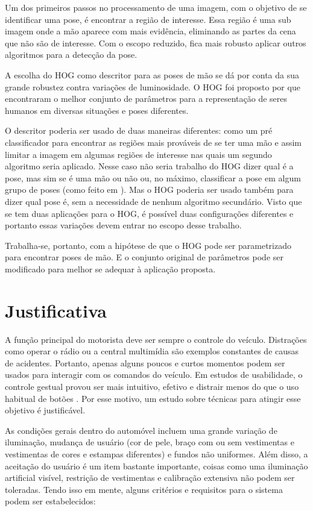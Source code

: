 Um dos primeiros passos no processamento de uma imagem, com o objetivo de se identificar uma pose, é encontrar a região de interesse. Essa região é uma sub imagem onde a mão aparece com mais evidência, eliminando as partes da cena que não são de interesse. Com o escopo reduzido, fica mais robusto aplicar outros algoritmos para a detecção da pose.

A escolha do HOG como descritor para as poses de mão se dá por conta da sua grande robustez contra variações de luminosidade. O HOG foi proposto por  que encontraram o melhor conjunto de parâmetros para a representação de seres humanos em diversas situações e poses diferentes. 

O descritor poderia ser usado de duas maneiras diferentes: como um pré classificador para encontrar as regiões mais prováveis de se ter uma mão e assim limitar a imagem em algumas regiões de interesse nas quais um segundo algoritmo seria aplicado. Nesse caso não seria trabalho do HOG dizer qual é a pose, mas sim se é uma mão ou não ou, no máximo, classificar a pose em algum grupo de poses (como feito em \cite{jiang2012robust}). Mas o HOG poderia ser usado também para dizer qual pose é, sem a necessidade de nenhum algoritmo secundário.
Visto que se tem duas aplicações para o HOG, é possível duas configurações diferentes e portanto essas variações devem entrar no escopo desse trabalho.

Trabalha-se, portanto, com a hipótese de que o HOG pode ser parametrizado para encontrar poses de mão. E o conjunto original de parâmetros pode ser modificado para melhor se adequar à aplicação proposta.

\section{Justificativa}

A função principal do motorista deve ser sempre o controle do veículo. Distrações como operar o rádio ou a central multimídia são exemplos constantes de causas de acidentes. Portanto, apenas alguns poucos e curtos momentos podem ser usados para interagir com os comandos do veículo. Em estudos de usabilidade, o controle gestual provou ser mais intuitivo, efetivo \cite{zobl2001usability} e distrair menos do que o uso habitual de botões \cite{geiger2001intermodal}. Por esse motivo, um estudo sobre técnicas para atingir esse objetivo é justificável.

As condições gerais dentro do automóvel incluem uma grande variação de iluminação, mudança de usuário (cor de pele, braço com ou sem vestimentas e vestimentas de cores e estampas diferentes) e fundos não uniformes. Além disso, a aceitação do usuário é um item bastante importante, coisas como uma iluminação artificial visível, restrição de vestimentas e calibração extensiva não podem ser toleradas. Tendo isso em mente, alguns critérios e requisitos para o sistema podem ser estabelecidos:

